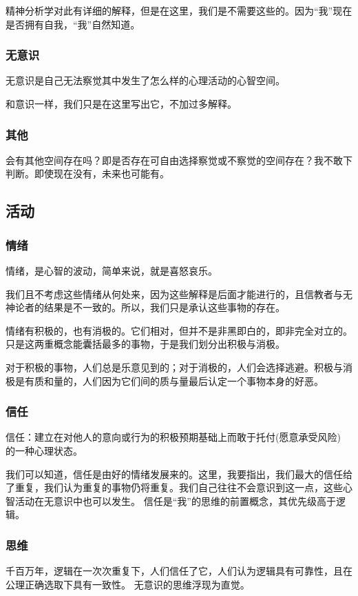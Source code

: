 \documentclass[fontset=windows, 12pt, a4paper]{article}
\begin{document}
精神分析学对此有详细的解释，但是在这里，我们是不需要这些的。因为“我”现在是否拥有自我，“我”自然知道。

\subsubsection{无意识}
无意识是自己无法察觉其中发生了怎么样的心理活动的心智空间。

和意识一样，我们只是在这里写出它，不加过多解释。

\subsubsection{其他}
会有其他空间存在吗？即是否存在可自由选择察觉或不察觉的空间存在？我不敢下判断。即使现在没有，未来也可能有。

\subsection{活动}

\subsubsection{情绪}
情绪，是心智的波动，简单来说，就是喜怒哀乐。

我们且不考虑这些情绪从何处来，因为这些解释是后面才能进行的，且信教者与无神论者的结果是不一致的。所以，我们只是承认这些事物的存在。

情绪有积极的，也有消极的。它们相对，但并不是非黑即白的，即非完全对立的。只是这两重概念能囊括最多的事物，于是我们划分出积极与消极。

对于积极的事物，人们总是乐意见到的；对于消极的，人们会选择逃避。积极与消极是有质和量的，人们因为它们间的质与量最后认定一个事物本身的好恶。

\subsubsection{信任}
信任：建立在对他人的意向或行为的积极预期基础上而敢于托付(愿意承受风险) 的一种心理状态。\cite{ref1}

我们可以知道，信任是由好的情绪发展来的。这里，我要指出，我们最大的信任给了重复，我们认为重复的事物仍将重复。我们自己往往不会意识到这一点，这些心智活动在无意识中也可以发生。
信任是“我”的思维的前置概念，其优先级高于逻辑。



\subsubsection{思维}
千百万年，逻辑在一次次重复下，人们信任了它，人们认为逻辑具有可靠性，且在公理正确选取下具有一致性。
无意识的思维浮现为直觉。
\end{document}
